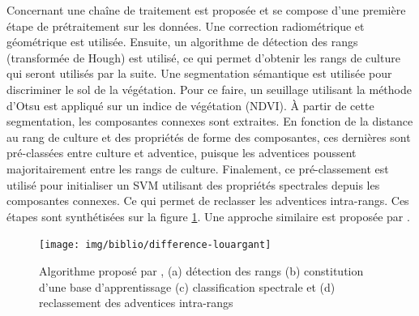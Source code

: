 \documentclass[../thesis.tex]{subfiles}
\begin{document}
    Concernant \cite{rs10050761} une chaîne de traitement est proposée et se compose d'une première étape de prétraitement sur les données. Une correction radiométrique et géométrique est utilisée. Ensuite, un algorithme de détection des rangs (transformée de Hough) est utilisé, ce qui permet d'obtenir les rangs de culture qui seront utilisés par la suite. Une segmentation sémantique est utilisée pour discriminer le sol de la végétation. Pour ce faire, un seuillage utilisant la méthode d'Otsu est appliqué sur un indice de végétation (NDVI). À partir de cette segmentation, les composantes connexes sont extraites. En fonction de la distance au rang de culture et des propriétés de forme des composantes, ces dernières sont pré-classées entre culture et adventice, puisque les adventices poussent majoritairement entre les rangs de culture. Finalement, ce pré-classement est utilisé pour initialiser un SVM utilisant des propriétés spectrales depuis les composantes connexes. Ce qui permet de reclasser les adventices intra-rangs. Ces étapes sont synthétisées sur la figure \ref{fig:difference-louargant}. Une approche similaire est proposée par \cite{rs10020285}. %
    
    \begin{figure}[H]
        \centering
        \texttt{[image: img/biblio/difference-louargant]}
        \caption{Algorithme proposé par \cite{rs10050761}, (a) détection des rangs (b) constitution d'une base d'apprentissage (c) classification spectrale et (d) reclassement des adventices intra-rangs}
        \label{fig:difference-louargant}
    \end{figure}
    
    
    \newpage
\end{document}
